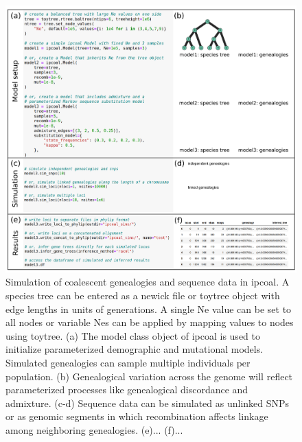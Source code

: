 \documentclass[11pt]{article}
\begin{document}
\begin{figure}
  \centering
  \includegraphics[width=15cm]{figures/composite.pdf}
  \caption{Simulation of coalescent genealogies and sequence data in ipcoal. A species tree can be entered as a newick file or toytree object with edge lengths in units of generations. A single Ne value can be set to all nodes or variable Nes can be applied by mapping values to nodes using toytree. (a) The model class object of ipcoal is used to initialize parameterized demographic and mutational models. Simulated genealogies can sample multiple individuals per population. (b) Genealogical variation across the genome will reflect parameterized processes like genealogical discordance and admixture. (c-d) Sequence data can be simulated as unlinked SNPs or as genomic segments in which recombination affects linkage among neighboring genealogies. (e)... (f)... }
  \label{fig:fig1}
\end{figure}



  
\end{document}
